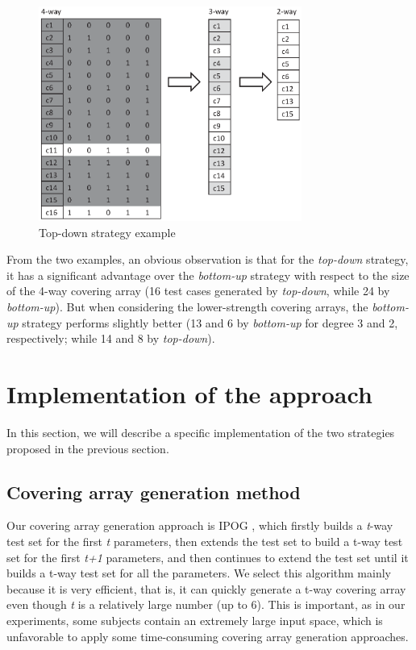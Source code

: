\documentclass[conference]{IEEEtran}
\theoremstyle{definition}
\begin{document}
\begin{figure}
 \includegraphics[width=3.4in]{decrease_example.eps}
\caption{Top-down strategy example}
\label{decrease-example}
\end{figure}


From the two examples, an obvious observation is that for the \emph{top-down} strategy, it has a significant advantage over the \emph{bottom-up} strategy with respect to the size of the 4-way covering array (16 test cases generated by \emph{top-down}, while 24 by \emph{bottom-up}). But when considering the lower-strength covering arrays, the \emph{bottom-up} strategy performs slightly better (13 and 6 by \emph{bottom-up} for degree 3 and 2, respectively; while 14 and 8 by \emph{top-down}).




\section{Implementation of the approach}
In this section, we will describe a specific implementation of the two strategies proposed in the previous section.

\subsection{Covering array generation method}
Our covering array generation approach is IPOG \cite{lei2007ipog,lei2008ipog,yu2013efficient}, which firstly builds a \emph{t}-way test set for the first \emph{t} parameters, then extends the test set to build a t-way test set for the first \emph{t+1} parameters, and then continues to extend the test set until it builds a t-way test set for all the parameters. We select this algorithm mainly because it is very efficient, that is, it can quickly generate a t-way covering array even though \emph{t} is a relatively large number (up to 6). This is important, as in our experiments, some subjects contain an extremely large input space, which is unfavorable to apply some time-consuming covering array generation approaches.
\end{document}
